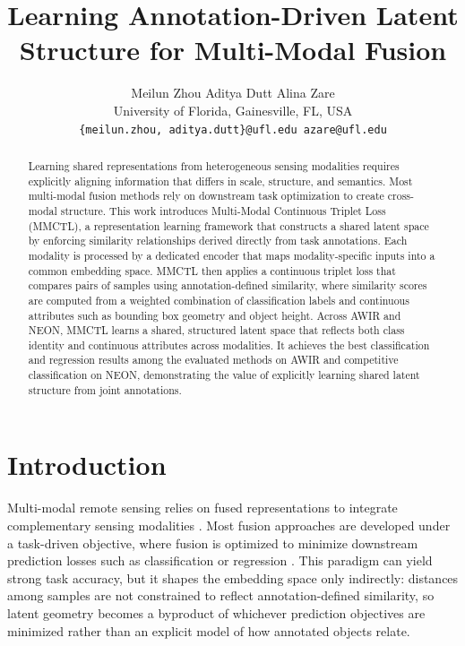 \documentclass[10pt,twocolumn,letterpaper]{article}
\title{Learning Annotation-Driven Latent Structure for Multi-Modal Fusion}
\author{Meilun Zhou \quad Aditya Dutt \quad Alina Zare\\
University of Florida, Gainesville, FL, USA\\
{\tt\small \{meilun.zhou, aditya.dutt\}@ufl.edu \quad azare@ufl.edu}}
\begin{document}
\maketitle

\begin{abstract}
Learning shared representations from heterogeneous sensing modalities requires explicitly aligning information that differs in scale, structure, and semantics. Most multi-modal fusion methods rely on downstream task optimization to create cross-modal structure. This work introduces Multi-Modal Continuous Triplet Loss (MMCTL), a representation learning framework that constructs a shared latent space by enforcing similarity relationships derived directly from task annotations. Each modality is processed by a dedicated encoder that maps modality-specific inputs into a common embedding space. MMCTL then applies a continuous triplet loss that compares pairs of samples using annotation-defined similarity, where similarity scores are computed from a weighted combination of classification labels and continuous attributes such as bounding box geometry and object height. Across AWIR and NEON, MMCTL learns a shared, structured latent space that reflects both class identity and continuous attributes across modalities. It achieves the best classification and regression results among the evaluated methods on AWIR and competitive classification on NEON, demonstrating the value of explicitly learning shared latent structure from joint annotations.
\end{abstract}

\section{Introduction}
Multi-modal remote sensing relies on fused representations to integrate complementary sensing modalities \cite{chen2024novel}. Most fusion approaches are developed under a task-driven objective, where fusion is optimized to minimize downstream prediction losses such as classification or regression \cite{bai2025task}. This paradigm can yield strong task accuracy, but it shapes the embedding space only indirectly: distances among samples are not constrained to reflect annotation-defined similarity, so latent geometry becomes a byproduct of whichever prediction objectives are minimized rather than an explicit model of how annotated objects relate.
\end{document}
